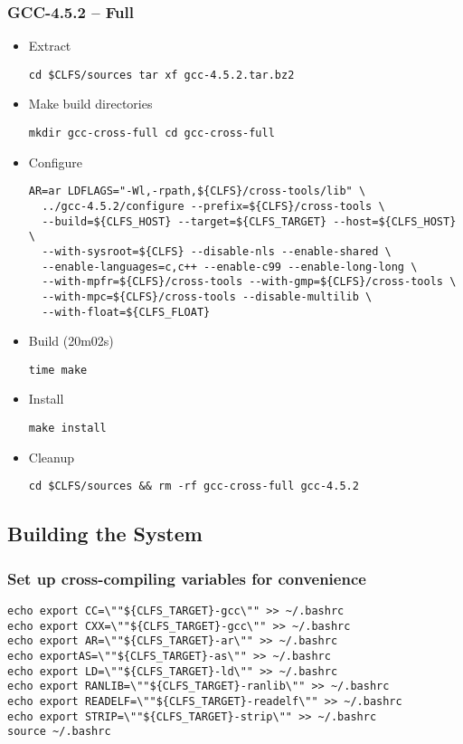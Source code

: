  \subsubsection{GCC-4.5.2 -- Full}
  \begin{itemize}
  \item Extract
    \begin{lstlisting}
cd $CLFS/sources tar xf gcc-4.5.2.tar.bz2
    \end{lstlisting}
  \item Make build directories
   \begin{lstlisting}
mkdir gcc-cross-full cd gcc-cross-full
   \end{lstlisting}
  \item Configure
   \begin{lstlisting}
AR=ar LDFLAGS="-Wl,-rpath,${CLFS}/cross-tools/lib" \
  ../gcc-4.5.2/configure --prefix=${CLFS}/cross-tools \
  --build=${CLFS_HOST} --target=${CLFS_TARGET} --host=${CLFS_HOST} \
  --with-sysroot=${CLFS} --disable-nls --enable-shared \
  --enable-languages=c,c++ --enable-c99 --enable-long-long \
  --with-mpfr=${CLFS}/cross-tools --with-gmp=${CLFS}/cross-tools \
  --with-mpc=${CLFS}/cross-tools --disable-multilib \
  --with-float=${CLFS_FLOAT}
   \end{lstlisting}
  \item Build (20m02s)
   \begin{lstlisting}
time make
   \end{lstlisting}
  \item Install
   \begin{lstlisting}
make install
   \end{lstlisting}
  \item Cleanup
   \begin{lstlisting}
cd $CLFS/sources && rm -rf gcc-cross-full gcc-4.5.2
   \end{lstlisting}
 \end{itemize}


\subsection{Building the System}
\subsubsection{Set up cross-compiling variables for convenience}
\begin{lstlisting}
echo export CC=\""${CLFS_TARGET}-gcc\"" >> ~/.bashrc
echo export CXX=\""${CLFS_TARGET}-gcc\"" >> ~/.bashrc
echo export AR=\""${CLFS_TARGET}-ar\"" >> ~/.bashrc
echo exportAS=\""${CLFS_TARGET}-as\"" >> ~/.bashrc
echo export LD=\""${CLFS_TARGET}-ld\"" >> ~/.bashrc
echo export RANLIB=\""${CLFS_TARGET}-ranlib\"" >> ~/.bashrc
echo export READELF=\""${CLFS_TARGET}-readelf\"" >> ~/.bashrc
echo export STRIP=\""${CLFS_TARGET}-strip\"" >> ~/.bashrc
source ~/.bashrc
\end{lstlisting}

